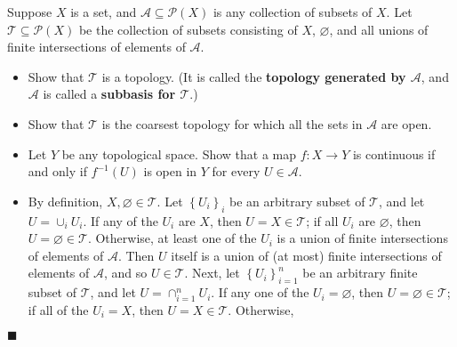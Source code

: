 \documentclass[12pt]{article}
\renewcommand{\qed}{\hfill$\blacksquare$}
\renewenvironment{proof}{\begin{addmargin}[1em]{0em}\begin{newproof}}{\end{newproof}\end{addmargin}\qed}
\newenvironment{problem}[2][Problem]{\begin{trivlist}
\item[\hskip \labelsep {\bfseries #1}\hskip \labelsep {\bfseries #2.}]}{\end{trivlist}}
\begin{document}
\begin{problem}{2-12}
Suppose $X$ is a set, and $\mathcal{A}\subseteq \mathcal{P}\left(X\right)$ is any collection of subsets of $X$. Let $\mathcal{T}\subseteq \mathcal{P}\left(X\right)$ be the collection of subsets consisting of $X$, $\varnothing$, and all unions of finite intersections of elements of $\mathcal{A}$.
\begin{itemize}
	\item Show that $\mathcal{T}$ is a topology. (It is called the \textbf{topology generated by $\mathcal{A}$}, and $\mathcal{A}$ is called a \textbf{subbasis for $\mathcal{T}$}.) 
	\item Show that $\mathcal{T}$ is the coarsest topology for which all the sets in $\mathcal{A}$ are open.
	\item Let $Y$ be any topological space. Show that a map $f:X\rightarrow Y$ is continuous if and only if $f^{-1}\left(U\right)$ is open in $Y$ for every $U\in \mathcal{A}$.
\end{itemize}
\end{problem}
\begin{proof}
\begin{itemize}
	\item By definition, $X,\varnothing \in \mathcal{T}$. Let $\left\{U_i\right\}_i$ be an arbitrary subset of $\mathcal{T}$, and let $U = \cup_i U_i$. If any of the $U_i$ are $X$, then $U=X \in \mathcal{T}$; if all $U_i$ are $\varnothing$, then $U = \varnothing \in \mathcal{T}$. Otherwise, at least one of the $U_i$ is a union of finite intersections of elements of $\mathcal{A}$. Then $U$ itself is a union of (at most) finite intersections of elements of $\mathcal{A}$, and so $U \in \mathcal{T}$. Next, let $\left\{U_i\right\}_{i=1}^n$ be an arbitrary finite subset of $\mathcal{T}$, and let $U = \cap_{i=1}^n U_i$. If any one of the $U_i=\varnothing$, then $U = \varnothing \in \mathcal{T}$; if all of the $U_i = X$, then $U=X\in \mathcal{T}$. Otherwise, 
\end{itemize}
\end{proof}
\end{document}
